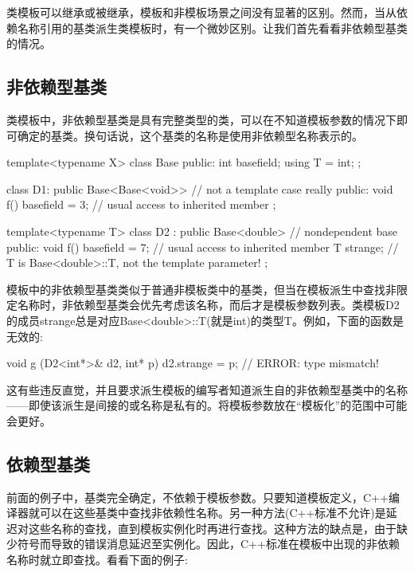 
类模板可以继承或被继承，模板和非模板场景之间没有显著的区别。然而，当从依赖名称引用的基类派生类模板时，有一个微妙区别。让我们首先看看非依赖型基类的情况。

\subsection{非依赖型基类}

类模板中，非依赖型基类是具有完整类型的类，可以在不知道模板参数的情况下即可确定的基类。换句话说，这个基类的名称是使用非依赖型名称表示的。

\begin{cpp}
template<typename X>
class Base {
	public:
	int basefield;
	using T = int;
};

class D1: public Base<Base<void>> { // not a template case really
	public:
	void f() { basefield = 3; } // usual access to inherited member
};

template<typename T>
class D2 : public Base<double> { // nondependent base
	public:
	void f() { basefield = 7; } // usual access to inherited member
	T strange; // T is Base<double>::T, not the template parameter!
};
\end{cpp}

模板中的非依赖型基类类似于普通非模板类中的基类，但当在模板派生中查找非限定名称时，非依赖型基类会优先考虑该名称，而后才是模板参数列表。类模板D2的成员strange总是对应Base<double>::T(就是int)的类型T。例如，下面的函数是无效的:

\begin{cpp}
void g (D2<int*>& d2, int* p)
{
	d2.strange = p; // ERROR: type mismatch!
}
\end{cpp}

这有些违反直觉，并且要求派生模板的编写者知道派生自的非依赖型基类中的名称——即使该派生是间接的或名称是私有的。将模板参数放在“模板化”的范围中可能会更好。

\subsection{依赖型基类}

前面的例子中，基类完全确定，不依赖于模板参数。只要知道模板定义，C++编译器就可以在这些基类中查找非依赖性名称。另一种方法(C++标准不允许)是延迟对这些名称的查找，直到模板实例化时再进行查找。这种方法的缺点是，由于缺少符号而导致的错误消息延迟至实例化。因此，C++标准在模板中出现的非依赖名称时就立即查找。看看下面的例子:


